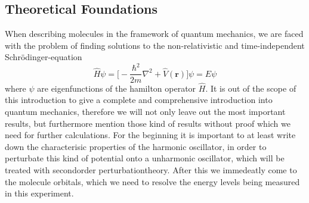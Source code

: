 \subsection{Theoretical Foundations}
When describing molecules in the framework of quantum mechanics, we are faced with the problem of 
finding solutions to the non-relativistic and time-independent Schrödinger-equation
\begin{equation}
    \hat{H} \psi = \Big[- \frac{\hbar^2}{2m} 
        \nabla^2 + \hat{V}(\mathbf{r}) \Big] \psi = E \psi
\end{equation}
where $\psi$ are eigenfunctions of the hamilton operator $\hat{H}$.
It is out of the scope of this introduction to give a complete
and comprehensive introduction into quantum mechanics, therefore
we will not only leave out the most important results, but
furthermore mention those kind of results without proof which
we need for further calculations. For the beginning it is
important to at least write down the characterisic properties
of the harmonic oscillator, in order to perturbate this
kind of potential onto a unharmonic oscillator, which will be
treated with secondorder perturbationtheory. After this we 
immedeatly come to the molecule orbitals, which we need
to resolve the energy levels being measured in this experiment.

